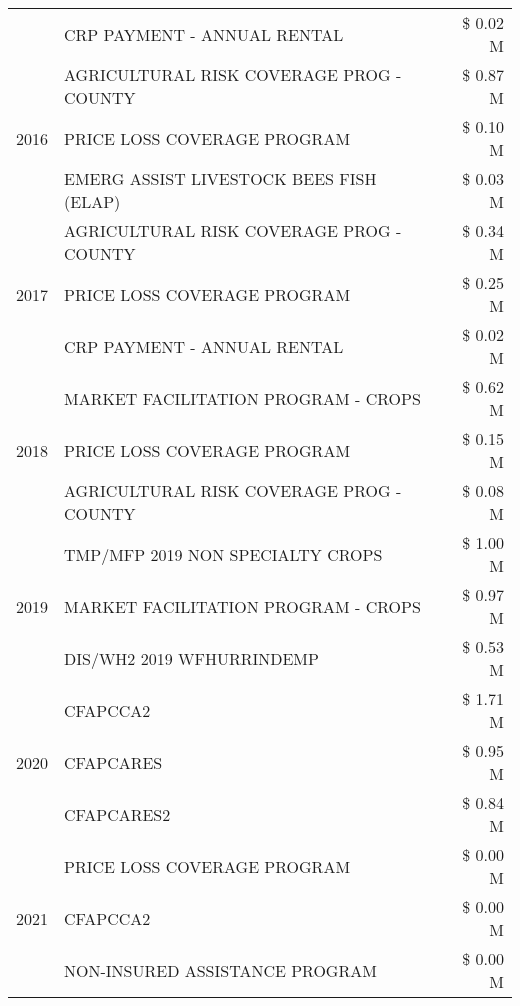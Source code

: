 \begin{tabular}{llr}
 & CRP PAYMENT - ANNUAL RENTAL & \$ 0.02 M \\
\cline{1-3}
\multirow[t]{3}{*}{2016} & AGRICULTURAL RISK COVERAGE PROG - COUNTY & \$ 0.87 M \\
 & PRICE LOSS COVERAGE PROGRAM & \$ 0.10 M \\
 & EMERG ASSIST LIVESTOCK BEES FISH (ELAP) & \$ 0.03 M \\
\cline{1-3}
\multirow[t]{3}{*}{2017} & AGRICULTURAL RISK COVERAGE PROG - COUNTY & \$ 0.34 M \\
 & PRICE LOSS COVERAGE PROGRAM & \$ 0.25 M \\
 & CRP PAYMENT - ANNUAL RENTAL & \$ 0.02 M \\
\cline{1-3}
\multirow[t]{3}{*}{2018} & MARKET FACILITATION PROGRAM - CROPS & \$ 0.62 M \\
 & PRICE LOSS COVERAGE PROGRAM & \$ 0.15 M \\
 & AGRICULTURAL RISK COVERAGE PROG - COUNTY & \$ 0.08 M \\
\cline{1-3}
\multirow[t]{3}{*}{2019} & TMP/MFP 2019 NON SPECIALTY CROPS & \$ 1.00 M \\
 & MARKET FACILITATION PROGRAM - CROPS & \$ 0.97 M \\
 & DIS/WH2 2019 WFHURRINDEMP & \$ 0.53 M \\
\cline{1-3}
\multirow[t]{3}{*}{2020} & CFAPCCA2 & \$ 1.71 M \\
 & CFAPCARES & \$ 0.95 M \\
 & CFAPCARES2 & \$ 0.84 M \\
\cline{1-3}
\multirow[t]{3}{*}{2021} & PRICE LOSS COVERAGE PROGRAM & \$ 0.00 M \\
 & CFAPCCA2 & \$ 0.00 M \\
 & NON-INSURED ASSISTANCE PROGRAM & \$ 0.00 M \\
\cline{1-3}
\bottomrule
\end{tabular}
